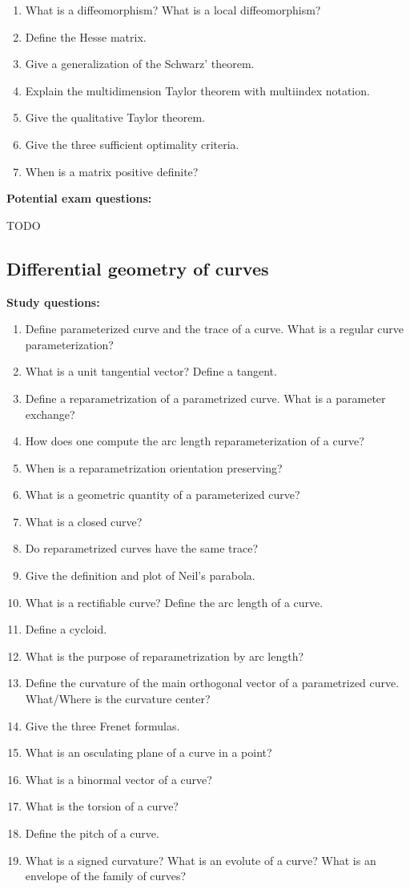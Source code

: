 \documentclass{article}
\begin{document}
\begin{enumerate}
  \item What is a diffeomorphism? What is a local diffeomorphism?
  \item Define the Hesse matrix.
  \item Give a generalization of the Schwarz' theorem.
  \item Explain the multidimension Taylor theorem with multiindex notation.
  \item Give the qualitative Taylor theorem.
  \item Give the three sufficient optimality criteria.
  \item When is a matrix positive definite?
\end{enumerate}

\textbf{Potential exam questions:}

TODO

\subsection{Differential geometry of curves}

\textbf{Study questions:}

\begin{enumerate}
  \item Define parameterized curve and the trace of a curve. What is a regular curve parameterization?
  \item What is a unit tangential vector? Define a tangent.
  \item Define a reparametrization of a parametrized curve. What is a parameter exchange?
  \item How does one compute the arc length reparameterization of a curve?
  \item When is a reparametrization orientation preserving?
  \item What is a geometric quantity of a parameterized curve?
  \item What is a closed curve?
  \item Do reparametrized curves have the same trace?
  \item Give the definition and plot of Neil's parabola.
  \item What is a rectifiable curve? Define the arc length of a curve.
  \item Define a cycloid.
  \item What is the purpose of reparametrization by arc length? %
  \item Define the curvature of the main orthogonal vector of a parametrized curve. What/Where is the curvature center?
  \item Give the three Frenet formulas.
  \item What is an osculating plane of a curve in a point?
  \item What is a binormal vector of a curve?
  \item What is the torsion of a curve?
  \item Define the pitch of a curve.
  \item What is a signed curvature? What is an evolute of a curve? What is an envelope of the family of curves?
\end{enumerate}
\end{document}
